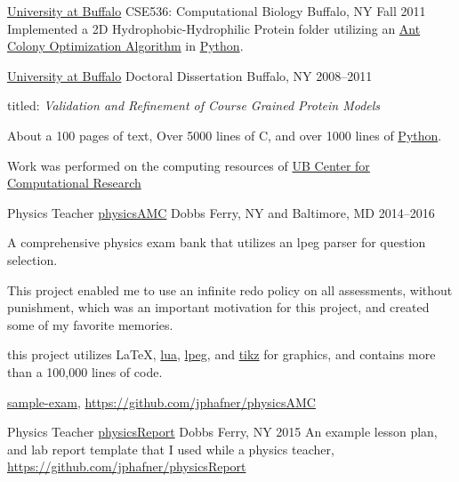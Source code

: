 \begin{cventries}
  \cventry
    {\href{www.buffalo.edu}{University at Buffalo}}
    {CSE536: Computational Biology}
    {Buffalo, NY} {Fall 2011}
    {Implemented a 2D Hydrophobic-Hydrophilic Protein folder utilizing an \href{https://en.wikipedia.org/wiki/Ant_colony_optimization_algorithms}{Ant Colony Optimization Algorithm} in \href{www.python.org}{Python}.}

  \cventry
    {\href{www.buffalo.edu}{University at Buffalo}}
    {Doctoral Dissertation}
    {Buffalo, NY} {2008--2011}
{
\begin{cvitems}
    \item {titled: \emph{Validation and Refinement of Course Grained Protein Models}}
    \item {About a 100 pages of text, Over 5000 lines of C, and over 1000 lines of \href{www.python.org}{Python}.}
    \item {Work was performed on the computing resources of \href{ccr.buffalo.edu}{UB Center for Computational Research}}
\end{cvitems}
}

  \cventry
    {Physics Teacher}
    {\href{https://github.com/jphafner/physicsAMC}{physicsAMC}}
    {Dobbs Ferry, NY and Baltimore, MD} {2014--2016}
    {
    \begin{cvitems}
        \item {A comprehensive physics exam bank that utilizes an lpeg parser for question selection.}
        \item {This project enabled me to use an infinite redo policy on all assessments, without punishment, which was an important motivation for this project, and created some of my favorite memories.}
        \item {this project utilizes \LaTeX, \href{lua.org}{lua}, \href{http://www.inf.puc-rio.br/~roberto/lpeg/}{lpeg}, and \href{http://www.texample.net/tikz/}{tikz} for graphics, and contains more than a 100,000 lines of code.}
	\item { \href{https://github.com/jphafner/physicsAMC/blob/mc-project/kinematics-exam/sample-exam.pdf}{sample-exam}, \url{https://github.com/jphafner/physicsAMC}}
    \end{cvitems}
    }
  \cventry
    {Physics Teacher}
    {\href{https://github.com/jphafner/physicsReport}{physicsReport}}
    {Dobbs Ferry, NY} {2015}
    {An example lesson plan, and lab report template that I used while a physics teacher, \url{https://github.com/jphafner/physicsReport}}
\end{cventries}

